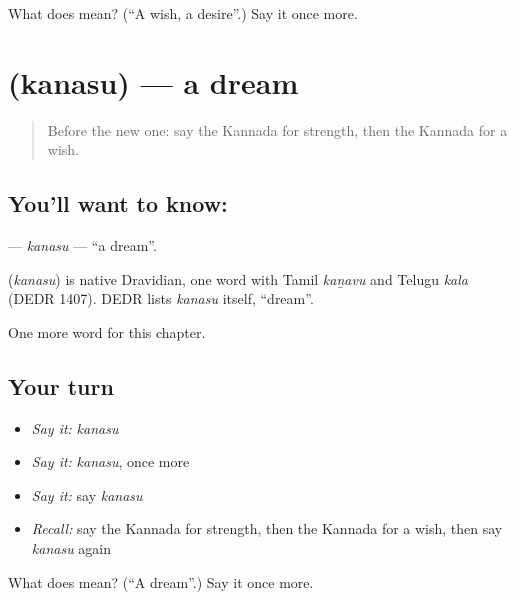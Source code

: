 \begin{tcolorbox}[breakable,colback=teal!4,colframe=teal!35!black,title={Before you move on}]
What does  mean? (\textquotedblleft{}A wish, a desire\textquotedblright{}.) Say it once more.
\end{tcolorbox}
\section[\texorpdfstring{\kn{ಕನಸು} (kanasu)}{ಕನಸು (kanasu)}]{ (kanasu) — a dream}

\label{lesson:KA-C113-kanasu}



\begin{quote}
Before the new one: say the Kannada for strength, then the Kannada for a wish.
\end{quote}

\subsection*{You'll want to know: }
\textbf{} — \emph{kanasu} — \textquotedblleft{}a dream\textquotedblright{}.

\begin{cousinweb}
\textbf{} (\emph{kanasu}) is native Dravidian, one word with Tamil \emph{kaṉavu} and Telugu \emph{kala} (DEDR 1407). DEDR lists \emph{kanasu} itself, \textquotedblleft{}dream\textquotedblright{}.
\end{cousinweb}

\begin{grammarlens}[title={What you've built}]
One more word for this chapter.
\end{grammarlens}

\subsection*{Your turn}
\begin{itemize}
\raggedright
  \item \emph{Say it:} \emph{kanasu}
  \item \emph{Say it:} \emph{kanasu}, once more
  \item \emph{Say it:} say \emph{kanasu}
  \item \emph{Recall:} say the Kannada for strength, then the Kannada for a wish, then say \emph{kanasu} again
\end{itemize}

\begin{tcolorbox}[breakable,colback=teal!4,colframe=teal!35!black,title={Before you move on}]
What does  mean? (\textquotedblleft{}A dream\textquotedblright{}.) Say it once more.
\end{tcolorbox}

